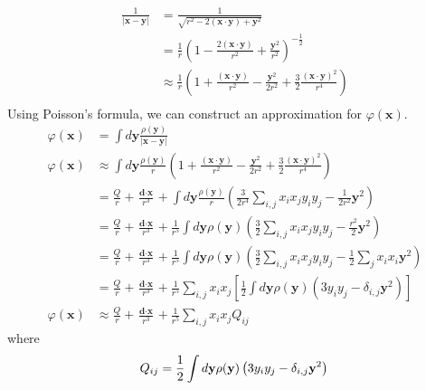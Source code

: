 \documentclass[]{book}
\begin{document}
\begin{equation}
\begin{split}
\frac{1}{|\textbf{x}-\textbf{y}|} & = \frac{1}{\sqrt{r^2-2(\textbf{x}\cdot\textbf{y})+\textbf{y}^2}}\\
&= \frac{1}{r}\left( 1 - \frac{2(\textbf{x}\cdot\textbf{y})}{r^2} +\frac{\textbf{y}^2}{r^2} \right)^{-\frac{1}{2}}\\
& \approx \frac{1}{r}\left( 1 +  \frac{(\textbf{x}\cdot\textbf{y})}{r^2}  - \frac{\textbf{y}^2}{2r^2}  + \frac{3}{2} \frac{(\textbf{x}\cdot\textbf{y})^2}{r^4} \right)\\
\end{split}
\end{equation}
Using Poisson's formula, we can construct an approximation for $\varphi(\textbf{x})$.
\begin{equation}
\begin{split}
\varphi(\textbf{x}) & = \int d\textbf{y} \frac{\rho(\textbf{y})}{|\textbf{x}-\textbf{y}|} \\
\varphi(\textbf{x}) & \approx \int d\textbf{y} \frac{\rho(\textbf{y})}{r} \left( 1 +  \frac{(\textbf{x}\cdot\textbf{y})}{r^2}  - \frac{\textbf{y}^2}{2r^2}  + \frac{3}{2} \frac{(\textbf{x}\cdot\textbf{y})^2}{r^4} \right)\\
& = \frac{Q}{r} + \frac{\textbf{d}\cdot\textbf{x}}{r^3} + \int d\textbf{y} \frac{\rho(\textbf{y})}{r} \left(\frac{3}{2r^4}\sum_{i,j}x_ix_jy_iy_j -\frac{1}{2r^2}\textbf{y}^2     \right)  \\ 
& = \frac{Q}{r} + \frac{\textbf{d}\cdot\textbf{x}}{r^3} + \frac{1}{r^5}\int d\textbf{y} \rho(\textbf{y}) \left(\frac{3}{2}\sum_{i,j}x_ix_jy_iy_j -\frac{r^2}{2}\textbf{y}^2     \right)  \\
& = \frac{Q}{r} + \frac{\textbf{d}\cdot\textbf{x}}{r^3} + \frac{1}{r^5}\int d\textbf{y} \rho(\textbf{y}) \left(\frac{3}{2}\sum_{i,j}x_ix_jy_iy_j -\frac{1}{2}\sum_{j}x_ix_i\textbf{y}^2\right)  \\
& = \frac{Q}{r} + \frac{\textbf{d}\cdot\textbf{x}}{r^3} + \frac{1}{r^5}\sum_{i,j}x_ix_j \left[\frac{1}{2}\int d\textbf{y} \rho(\textbf{y}) \left(3y_iy_j -\delta_{i,j}\textbf{y}^2\right) \right] \\
\varphi(\textbf{x}) & \approx \frac{Q}{r} + \frac{\textbf{d}\cdot\textbf{x}}{r^3} + \frac{1}{r^5}\sum_{i,j}x_ix_j Q_{ij}
\end{split}
\end{equation}
where
\begin{equation}
Q_{ij} = \frac{1}{2}\int d\textbf{y} \rho(\textbf{y}) \left(3y_iy_j -\delta_{i,j}\textbf{y}^2\right) \\
\end{equation}
\end{document}
